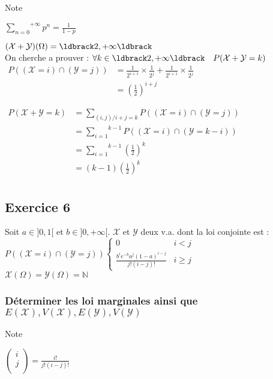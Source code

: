 \documentclass[a4paper, 12pt]{article}
\begin{document}
\begin{note}{Note}
{
\Large
\begin{center}
$\overset{+\infty}{\underset{n = 0}{\sum}} p^n = \frac{1}{1 - p}$
\end{center}
}
\end{note}

$(\mathcal{X} + \mathcal{Y})(\Omega) = \ldbrack 2, +\infty \ldbrack$ \\

On cherche a prouver : $\forall k \in \ldbrack 2, +\infty \ldbrack \quad P (\mathcal{X} + \mathcal{Y} = k)$ \\

$
\begin{aligned}
P ((\mathcal{X} = i) \cap (\mathcal{Y} = j)) &= \frac{1}{2^{i + 1}} \times \frac{1}{2^j} + \frac{1}{2^{i + 1}} \times \frac{1}{2^j} \\
&= \left ( \frac{1}{2} \right )^{i + j}
\end{aligned}
$

$
\begin{aligned}
P (\mathcal{X} + \mathcal{Y} = k) &= \underset{(i, j) / i + j = k}{\sum} P ((\mathcal{X} = i) \cap (\mathcal{Y} = j)) \\
&= \overset{k - 1}{\underset{i = 1}{\sum}} P ((\mathcal{X} = i) \cap (\mathcal{Y} = k - i)) \\
&= \overset{k - 1}{\underset{i = 1}{\sum}} \left ( \frac{1}{2} \right )^{k} \\
&\boxed{= (k - 1) \left ( \frac{1}{2} \right )^{k}} \\
\end{aligned}
$

\subsection{Exercice 6}
Soit $a \in ] 0, 1 [$ et $b \in ] 0, +\infty [$. $\mathcal{X}$ et $\mathcal{Y}$ deux v.a. dont la loi conjointe est : \\
$P ((\mathcal{X} = i) \cap (\mathcal{Y} = j))
\left \{
\begin{array}{lc}
0 & i < j \\
\frac{b^i e^{-b} a^j (1 - a)^{i - j}}{j! (i - j)!} & i \geq j
\end{array}
\right .
$\\
$\mathcal{X} (\Omega) = \mathcal{Y} (\Omega) = \mathbb{N}$

\subsubsection{Déterminer les loi marginales ainsi que $E(\mathcal{X}), V(\mathcal{X}), E(\mathcal{Y}), V(\mathcal{Y})$}
\begin{note}{Note}
{
\Large
\begin{center}
$
\left (
\begin{array}{c}
i \\
j \\
\end{array}
\right )
 = \frac{i!}{j! (i - j)!}
$
\end{center}
}
\end{note}
\end{document}
